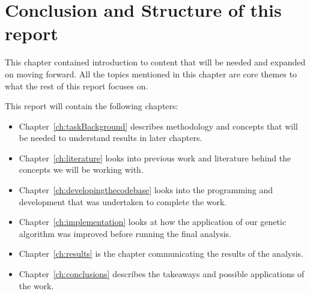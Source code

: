 \section{Conclusion and Structure of this report}
This chapter contained introduction to content that will be needed and expanded on moving forward. 
All the topics mentioned in this chapter are core themes to what the rest of this report focuses on.

This report will contain the following chapters:
\begin{itemize}
    \item Chapter~\ref{ch:taskBackground} describes methodology and concepts that will be needed to understand results in later chapters.
    \item Chapter~\ref{ch:literature} looks into previous work and literature behind the concepts we will be working with.
    \item Chapter~\ref{ch:developingthecodebase} looks into the programming and development that was undertaken to complete the work.
    \item Chapter~\ref{ch:implementation} looks at how the application of our genetic algorithm was improved before running the final analysis.
    \item Chapter~\ref{ch:results} is the chapter communicating the results of the analysis.
    \item Chapter~\ref{ch:conclusions} describes the takeaways and possible applications of the work.
\end{itemize}
